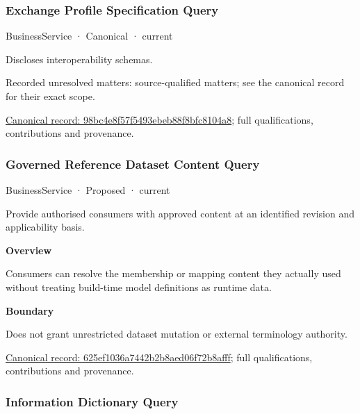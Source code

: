 \subsubsection{Exchange Profile Specification Query}

\label{element:98bc4e8f57f5493ebeb88f8bfc8104a8}
{\small BusinessService · Canonical · current}\par

Discloses interoperability schemas.


{\small Recorded unresolved matters: source-qualified matters; see the canonical record for their exact scope.}\par
{\footnotesize \href{../../../../continuum/business/business-service/98bc4e8f57f5493ebeb88f8bfc8104a8.md}{Canonical record: 98bc4e8f57f5493ebeb88f8bfc8104a8}; full qualifications, contributions and provenance.}\par
\subsubsection{Governed Reference Dataset Content Query}

\label{element:625ef1036a7442b2b8aed06f72b8afff}
{\small BusinessService · Proposed · current}\par

Provide authorised consumers with approved content at an identified revision and applicability basis.



\textbf{Overview}



Consumers can resolve the membership or mapping content they actually used without treating build-time model definitions as runtime data.



\textbf{Boundary}



Does not grant unrestricted dataset mutation or external terminology authority.


{\footnotesize \href{../../../../continuum/business/business-service/625ef1036a7442b2b8aed06f72b8afff.md}{Canonical record: 625ef1036a7442b2b8aed06f72b8afff}; full qualifications, contributions and provenance.}\par
\subsubsection{Information Dictionary Query}

